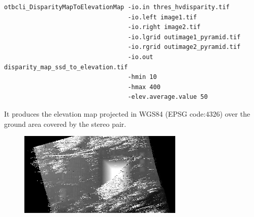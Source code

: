 \begin{verbatim}
otbcli_DisparityMapToElevationMap -io.in thres_hvdisparity.tif
                                  -io.left image1.tif
                                  -io.right image2.tif
                                  -io.lgrid outimage1_pyramid.tif
                                  -io.rgrid outimage2_pyramid.tif
                                  -io.out disparity_map_ssd_to_elevation.tif
                                  -hmin 10
                                  -hmax 400
                                  -elev.average.value 50
\end{verbatim}

It produces the elevation map projected in WGS84 (EPSG code:$4326$) over the
ground area covered by the stereo pair.

\begin{figure}[!h]
  \center
  \includegraphics[width=0.7\textwidth]{../Art/MonteverdiImages/stereo_dem_zoom.png}
  \label{fig:MeanShiftVectorImageFilter}
\end{figure}

